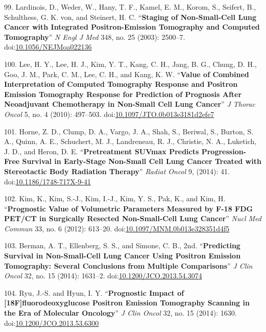 \documentclass[11pt,]{article}
\begin{document}
\hypertarget{ref-Lardinois:2003aa}{}
99. Lardinois, D., Weder, W., Hany, T. F., Kamel, E. M., Korom, S.,
Seifert, B., Schulthess, G. K. von, and Steinert, H. C.
``\textbf{Staging of Non-Small-Cell Lung Cancer with Integrated
Positron-Emission Tomography and Computed Tomography}'' \emph{N Engl J
Med} 348, no. 25 (2003): 2500--7.
doi:\href{https://doi.org/10.1056/NEJMoa022136}{10.1056/NEJMoa022136}

\hypertarget{ref-Lee:2010aa}{}
100. Lee, H. Y., Lee, H. J., Kim, Y. T., Kang, C. H., Jang, B. G.,
Chung, D. H., Goo, J. M., Park, C. M., Lee, C. H., and Kang, K. W.
``\textbf{Value of Combined Interpretation of Computed Tomography
Response and Positron Emission Tomography Response for Prediction of
Prognosis After Neoadjuvant Chemotherapy in Non-Small Cell Lung
Cancer}'' \emph{J Thorac Oncol} 5, no. 4 (2010): 497--503.
doi:\href{https://doi.org/10.1097/JTO.0b013e3181d2efe7}{10.1097/JTO.0b013e3181d2efe7}

\hypertarget{ref-Horne:2014aa}{}
101. Horne, Z. D., Clump, D. A., Vargo, J. A., Shah, S., Beriwal, S.,
Burton, S. A., Quinn, A. E., Schuchert, M. J., Landreneau, R. J.,
Christie, N. A., Luketich, J. D., and Heron, D. E.
``\textbf{Pretreatment SUVmax Predicts Progression-Free Survival in
Early-Stage Non-Small Cell Lung Cancer Treated with Stereotactic Body
Radiation Therapy}'' \emph{Radiat Oncol} 9, (2014): 41.
doi:\href{https://doi.org/10.1186/1748-717X-9-41}{10.1186/1748-717X-9-41}

\hypertarget{ref-Kim:2012aa}{}
102. Kim, K., Kim, S.-J., Kim, I.-J., Kim, Y. S., Pak, K., and Kim, H.
``\textbf{Prognostic Value of Volumetric Parameters Measured by F-18 FDG
PET/CT in Surgically Resected Non-Small-Cell Lung Cancer}'' \emph{Nucl
Med Commun} 33, no. 6 (2012): 613--20.
doi:\href{https://doi.org/10.1097/MNM.0b013e328351d4f5}{10.1097/MNM.0b013e328351d4f5}

\hypertarget{ref-Berman:2014aa}{}
103. Berman, A. T., Ellenberg, S. S., and Simone, C. B., 2nd.
``\textbf{Predicting Survival in Non-Small-Cell Lung Cancer Using
Positron Emission Tomography: Several Conclusions from Multiple
Comparisons}'' \emph{J Clin Oncol} 32, no. 15 (2014): 1631--2.
doi:\href{https://doi.org/10.1200/JCO.2013.54.3074}{10.1200/JCO.2013.54.3074}

\hypertarget{ref-Ryu:2014aa}{}
104. Ryu, J.-S. and Hyun, I. Y. ``\textbf{Prognostic Impact of
{[}18F{]}fluorodeoxyglucose Positron Emission Tomography Scanning in the
Era of Molecular Oncology}'' \emph{J Clin Oncol} 32, no. 15 (2014):
1630.
doi:\href{https://doi.org/10.1200/JCO.2013.53.6300}{10.1200/JCO.2013.53.6300}
\end{document}
